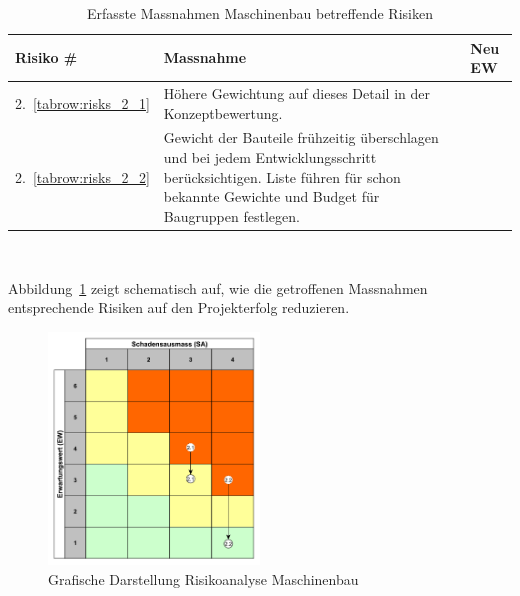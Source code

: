 \documentclass[main.tex]{subfiles} %
\begin{document}
\begin{table}[H]
    \begin{tabularx}{\textwidth}{|>{\centering\arraybackslash}p{2cm}|>{\raggedright\arraybackslash}X|>{\centering\arraybackslash}p{0.75cm}|}
        \hline
        \textbf{Risiko \#}        & \textbf{Massnahme}
                                  & \textbf{Neu EW}                                                                                                                                                               \\

        \hline
        \rowcolor{yellow!30}
        2.~\ref{tabrow:risks_2_1} & Höhere Gewichtung auf dieses Detail in der Konzeptbewertung.
                                  & 3                                                                                                                                                                             \\

        \hline
        \rowcolor{green!30}
        2.~\ref{tabrow:risks_2_2} & Gewicht der Bauteile frühzeitig überschlagen und bei jedem Entwicklungsschritt berücksichtigen. Liste führen für schon bekannte Gewichte und Budget für Baugruppen festlegen.
                                  & 1                                                                                                                                                                             \\

        \hline

    \end{tabularx}
    \caption{Erfasste Massnahmen Maschinenbau betreffende Risiken}~\label{tab:Erfasste_Massnahmen_mech}
\end{table}

Abbildung~\ref{fig:Diagramm_Risiko_mechanik} zeigt schematisch auf, wie die
getroffenen Massnahmen entsprechende Risiken auf den Projekterfolg reduzieren.

\begin{figure}[h]
    \centering
    \includegraphics[width=0.5\textwidth]{./Risks_Diagramm/Diagramm_Risiko_mechanik.pdf}
    \caption{Grafische Darstellung Risikoanalyse Maschinenbau}
    \label{fig:Diagramm_Risiko_mechanik}
\end{figure}
\end{document}
